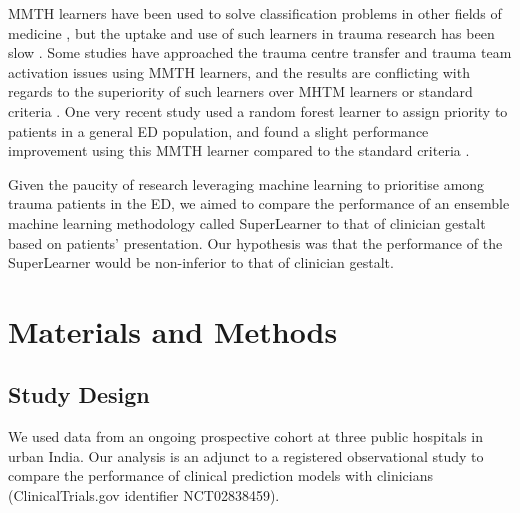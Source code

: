 \documentclass[10pt,letterpaper]{article}\usepackage[]{graphicx}\usepackage[]{color}
\begin{document}
MMTH learners have been used to solve classification problems in other fields of
medicine \cite{Nevin2018}, but the uptake and use of such learners in trauma
research has been slow \cite{Liu2017}. Some studies have approached the trauma
centre transfer and trauma team activation issues using MMTH learners, and the
results are conflicting with regards to the superiority of such learners over
MHTM learners or standard criteria
\cite{Talbert2007,Pearl2008,Scerbo2014,Follin2016}. One very recent study used a
random forest learner to assign priority to patients in a general ED population,
and found a slight performance improvement using this MMTH learner compared to
the standard criteria \cite{Levin2018}.

Given the paucity of research leveraging machine learning to prioritise among
trauma patients in the ED, we aimed to compare the performance of an ensemble
machine learning methodology called SuperLearner to that of clinician gestalt
based on patients’ presentation. Our hypothesis was that the performance of the
SuperLearner would be non-inferior to that of clinician gestalt.

\section*{Materials and Methods}
\subsection*{Study Design}
We used data from an ongoing prospective cohort at three public hospitals in
urban India. Our analysis is an adjunct to a registered observational study to
compare the performance of clinical prediction models with clinicians
(ClinicalTrials.gov identifier NCT02838459).

\end{document}
